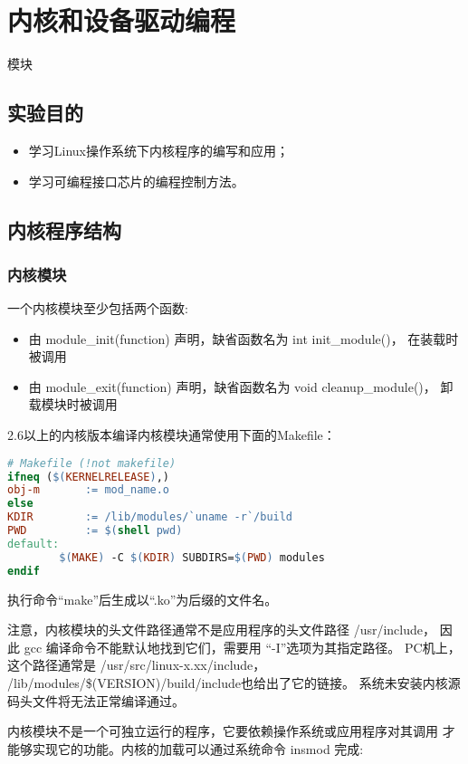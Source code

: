 \chapter{内核和设备驱动编程}{模块}

\section{实验目的}
\begin{itemize}
  \item 学习Linux操作系统下内核程序的编写和应用；
  \item 学习可编程接口芯片的编程控制方法。
\end{itemize}

\section{内核程序结构}
\subsection{内核模块}	
	一个内核模块至少包括两个函数:
\begin{itemize}
  \item 由 module\_init(function) 声明，缺省函数名为 int init\_module()，
		在装载时被调用
  \item 由 module\_exit(function) 声明，缺省函数名为 void cleanup\_module()，
		卸载模块时被调用
\end{itemize}

2.6以上的内核版本编译内核模块通常使用下面的Makefile：

\begin{lstlisting}[language=make]
# Makefile (!not makefile)
ifneq ($(KERNELRELEASE),)
obj-m       := mod_name.o
else
KDIR        := /lib/modules/`uname -r`/build
PWD         := $(shell pwd)
default:
        $(MAKE) -C $(KDIR) SUBDIRS=$(PWD) modules
endif
\end{lstlisting}

执行命令``make''后生成以``.ko''为后缀的文件名。

注意，内核模块的头文件路径通常不是应用程序的头文件路径 /usr/include，
因此 gcc 编译命令不能默认地找到它们，需要用 ``-I''选项为其指定路径。
PC机上，这个路径通常是 /usr/src/linux-x.xx/include，
/lib/modules/\$(VERSION)/build/include也给出了它的链接。
系统未安装内核源码头文件将无法正常编译通过。

内核模块不是一个可独立运行的程序，它要依赖操作系统或应用程序对其调用
才能够实现它的功能。内核的加载可以通过系统命令 insmod 完成:

